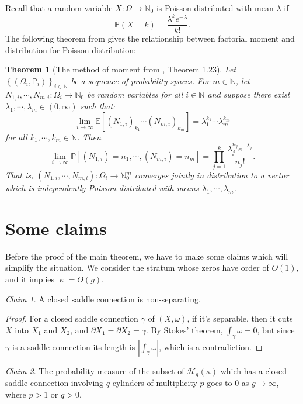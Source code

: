 \documentclass[12pt]{amsart} %
\newtheorem{theorem}{Theorem}[section]
\theoremstyle{definition}
\theoremstyle{remark}
\numberwithin{equation}{section}
\newtheorem{clm}{Claim}
\renewcommand\H{{\mathcal H}}
\begin{document}
Recall that a random variable $X:\Omega \to \mathbb{N}_0$ is Poisson distributed with mean $\lambda$ if
$$\mathbb{P}(X=k)=\frac{\lambda^k e^{-\lambda}}{k!}.$$
The following theorem from \cite{bollobas2001random} gives the relationship between factorial moment and distribution for Poisson distribution:
\begin{theorem}[The method of moment from \cite{bollobas2001random}, Theorem 1.23]\label{moment}
Let $\left\{(\Omega_i,\mathbb{P}_i)\right\}_{i\in \mathbb{N}}$ be a sequence of probability spaces. 
For $m\in \mathbb{N}$, let $N_{1,i},\cdots,N_{m,i}:\Omega_i\to \mathbb{N}_0$ be random variables for all $i\in \mathbb{N}$
and suppose there exist $\lambda_1,\cdots,\lambda_m\in(0,\infty)$ such that:
$$\lim_{i\to \infty}\mathbb{E}[(N_{1,i})_{k_1}\cdots(N_{m,i})_{k_m}]=\lambda_1^{k_1}\cdots\lambda_m^{k_m}$$
for all $k_1,\cdots,k_m\in \mathbb{N}$. Then
$$\lim_{i\to \infty}\mathbb{P}[(N_{1,i})=n_1,\cdots,(N_{m,i})=n_m]=\prod^k_{j=1}\frac{\lambda_j^{n_j} e^{-\lambda_j}}{n_j!}.$$
That is, $(N_{1,i},\cdots,N_{m,i}):\Omega_i \to \mathbb{N}^m_0$ converges jointly in distribution to a vector which is independently Poisson distributed with means 
$\lambda_1,\cdots,\lambda_m$.

\end{theorem}

\section{Some claims}\label{claim}
Before the proof of the main theorem, we have to make some claims which will simplify the situation.
We consider the stratum whose zeros have order of $O(1)$, and it implies $|\kappa|=O(g)$. 


\begin{clm} \label{clm1}
A closed saddle connection is non-separating.
\end{clm}
\begin{proof}
For a closed saddle connection $\gamma$ of $(X,\omega)$, if it's separable, then it cuts $X$ into $X_1$ and $X_2$, and $\partial X_1=\partial X_2=\gamma$.
By Stokes' theorem, $\int_\gamma \omega=0$, but since $\gamma$ is a saddle connection its length is $|\int_\gamma \omega|$, which is a contradiction.
\end{proof}

\begin{clm} \label{clm2}
The probability measure of the subset of $\H_g(\kappa)$ which has a closed saddle connection involving $q$ cylinders of multiplicity $p$ 
goes to $0$ as $g\to \infty$, where $p>1$ or $q>0$.
\end{clm}
\end{document}
